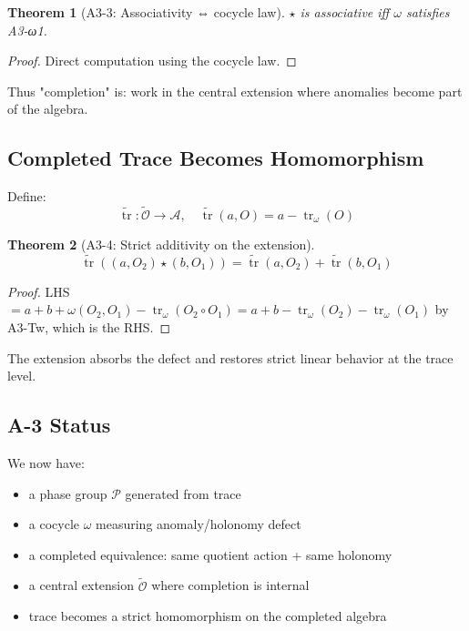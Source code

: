 \documentclass[12pt, oneside]{article}
\newtheorem{theorem}{Theorem}[section]
\DeclareMathOperator{\tr}{tr}
\newcommand{\A}{\mathcal{A}}
\newcommand{\Opr}{\mathcal{O}}
\newcommand{\wtilde}{\widetilde}
\begin{document}
\begin{theorem}[A3-3: Associativity ⇔ cocycle law]
$\star$ is associative iff $\omega$ satisfies A3-ω1.
\end{theorem}

\begin{proof}
Direct computation using the cocycle law.
\end{proof}

Thus "completion" is: work in the central extension where anomalies become part of the algebra.

\subsection{Completed Trace Becomes Homomorphism}

Define:
\begin{equation}
\wtilde{\tr}: \wtilde{\Opr} \rightarrow \A,\quad \wtilde{\tr}(a, O) = a - \tr_\omega(O)
\end{equation}

\begin{theorem}[A3-4: Strict additivity on the extension]
\begin{equation}
\wtilde{\tr}((a, O_2) \star (b, O_1)) = \wtilde{\tr}(a, O_2) + \wtilde{\tr}(b, O_1)
\end{equation}
\end{theorem}

\begin{proof}
LHS $= a + b + \omega(O_2,O_1) - \tr_\omega(O_2\circ O_1) = a+b-\tr_\omega(O_2)-\tr_\omega(O_1)$ by A3-Tw, which is the RHS.
\end{proof}

The extension absorbs the defect and restores strict linear behavior at the trace level.

\subsection{A-3 Status}

We now have:
\begin{itemize}
    \item a phase group $\mathcal{P}$ generated from trace
    \item a cocycle $\omega$ measuring anomaly/holonomy defect
    \item a completed equivalence: same quotient action + same holonomy
    \item a central extension $\wtilde{\Opr}$ where completion is internal
    \item trace becomes a strict homomorphism on the completed algebra
\end{itemize}
\end{document}
